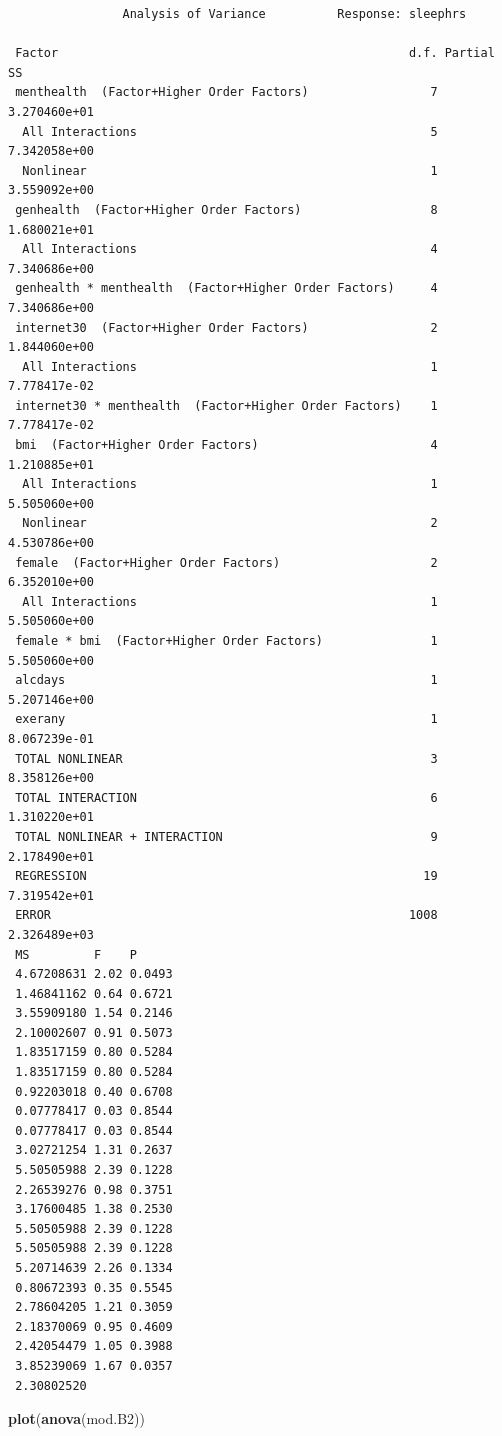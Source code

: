 \documentclass[]{book}
\newenvironment{Shaded}{\begin{snugshade}}{\end{snugshade}}
\newcommand{\KeywordTok}[1]{\textcolor[rgb]{0.13,0.29,0.53}{\textbf{#1}}}
\newcommand{\NormalTok}[1]{#1}
\theoremstyle{definition}
\theoremstyle{definition}
\theoremstyle{definition}
\theoremstyle{remark}
\begin{document}
\begin{verbatim}
                Analysis of Variance          Response: sleephrs 

 Factor                                                 d.f. Partial SS  
 menthealth  (Factor+Higher Order Factors)                 7 3.270460e+01
  All Interactions                                         5 7.342058e+00
  Nonlinear                                                1 3.559092e+00
 genhealth  (Factor+Higher Order Factors)                  8 1.680021e+01
  All Interactions                                         4 7.340686e+00
 genhealth * menthealth  (Factor+Higher Order Factors)     4 7.340686e+00
 internet30  (Factor+Higher Order Factors)                 2 1.844060e+00
  All Interactions                                         1 7.778417e-02
 internet30 * menthealth  (Factor+Higher Order Factors)    1 7.778417e-02
 bmi  (Factor+Higher Order Factors)                        4 1.210885e+01
  All Interactions                                         1 5.505060e+00
  Nonlinear                                                2 4.530786e+00
 female  (Factor+Higher Order Factors)                     2 6.352010e+00
  All Interactions                                         1 5.505060e+00
 female * bmi  (Factor+Higher Order Factors)               1 5.505060e+00
 alcdays                                                   1 5.207146e+00
 exerany                                                   1 8.067239e-01
 TOTAL NONLINEAR                                           3 8.358126e+00
 TOTAL INTERACTION                                         6 1.310220e+01
 TOTAL NONLINEAR + INTERACTION                             9 2.178490e+01
 REGRESSION                                               19 7.319542e+01
 ERROR                                                  1008 2.326489e+03
 MS         F    P     
 4.67208631 2.02 0.0493
 1.46841162 0.64 0.6721
 3.55909180 1.54 0.2146
 2.10002607 0.91 0.5073
 1.83517159 0.80 0.5284
 1.83517159 0.80 0.5284
 0.92203018 0.40 0.6708
 0.07778417 0.03 0.8544
 0.07778417 0.03 0.8544
 3.02721254 1.31 0.2637
 5.50505988 2.39 0.1228
 2.26539276 0.98 0.3751
 3.17600485 1.38 0.2530
 5.50505988 2.39 0.1228
 5.50505988 2.39 0.1228
 5.20714639 2.26 0.1334
 0.80672393 0.35 0.5545
 2.78604205 1.21 0.3059
 2.18370069 0.95 0.4609
 2.42054479 1.05 0.3988
 3.85239069 1.67 0.0357
 2.30802520            
\end{verbatim}

\begin{Shaded}
\begin{Highlighting}[]
\KeywordTok{plot}\NormalTok{(}\KeywordTok{anova}\NormalTok{(mod.B2))}
\end{Highlighting}
\end{Shaded}
\end{document}

